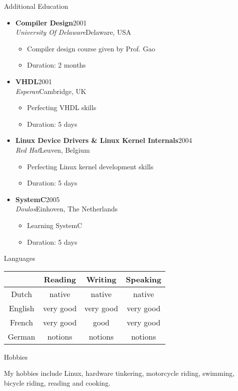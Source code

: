 \documentclass[12pt,oneside]{article}
\makeatletter
\newenvironment{ressection}[1]{
	\vspace{5pt}
	{\selectfont\Large#1}
	\begin{itemize}
	\vspace{5pt}
}{
	\end{itemize}
}
\newenvironment{hobbies}{
	\vspace{5pt}
	{\selectfont\Large Hobbies}
	\vspace{5pt}
	\begin{flushleft}
}{
	\end{flushleft}
	\vspace{5pt}
}
\newcommand{\ressubitem}[1]{
	\vspace{-4pt}
	\item \begin{flushleft} #1 \end{flushleft}
}
\newcommand{\resbigitem}[4]{
	\vspace{-5pt}
	\item
	\textbf{#1}\hfill#4 \\
	\textit{#2}\hfill#3
}
\newenvironment{ressubsec}[4]{
	\resbigitem{#1}{#2}{#3}{#4}
	\vspace{-2pt}
	\begin{itemize}
}{
	\end{itemize}
}
\newcommand{\langhdr}{
& Reading & Writing & Speaking \\
}
\newcommand{\lang}[4]{
#1 & #2 & #3 & #4 \\
}
\newenvironment{languages}{
	\vspace{5pt}
	{\selectfont\Large Languages} \\
	\begin{center}
	\begin{tabular*}{0.75\textwidth}{@{\extracolsep{\fill}}cccc}
	\langhdr
	\hline
}{
	\end{tabular*}
	\end{center}
	\vspace{5pt}
}
\makeatother
\begin{document}
\begin{ressection}{Additional Education}
	\begin{ressubsec}{Compiler Design}{University Of Delaware}{Delaware, USA}{2001}
		\ressubitem{Compiler design course given by Prof. Gao}
		\ressubitem{Duration: 2 months}
	\end{ressubsec}
	\begin{ressubsec}{VHDL}{Esperan}{Cambridge, UK}{2001}
		\ressubitem{Perfecting VHDL skills}
		\ressubitem{Duration: 5 days}
	\end{ressubsec}
	\begin{ressubsec}{Linux Device Drivers \& Linux Kernel Internals}{Red Hat}{Leuven, Belgium}{2004}
		\ressubitem{Perfecting Linux kernel development skills}
		\ressubitem{Duration: 5 days}
	\end{ressubsec}
	\begin{ressubsec}{SystemC}{Doulos}{Einhoven, The Netherlands}{2005}
		\ressubitem{Learning SystemC}
		\ressubitem{Duration: 5 days}
	\end{ressubsec}
\end{ressection}

\begin{languages}
\lang{Dutch}{native}{native}{native}
\lang{English}{very good}{very good}{very good}
\lang{French}{very good}{good}{very good}
\lang{German}{notions}{notions}{notions}
\end{languages}

\begin{hobbies}
My hobbies include Linux, hardware tinkering, motorcycle riding, swimming,
bicycle riding, reading and cooking.
\end{hobbies}
\end{document}
